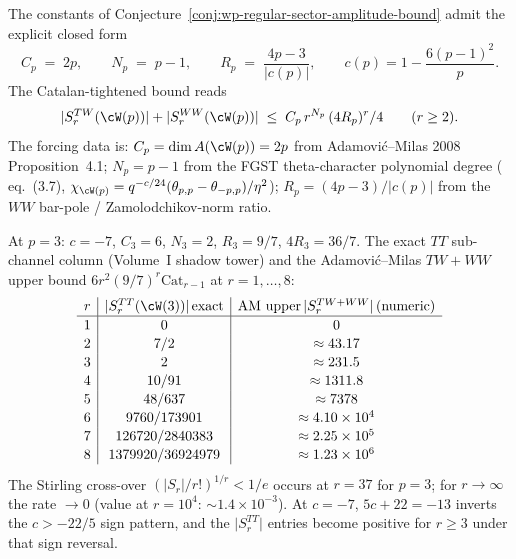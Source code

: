 \begin{proposition}[Adamovi\'c--Milas closed-form constants for the
$\cW(p)$ amplitude bound;
licensing $\alpha + \beta + \gamma + \delta + \varepsilon$;
\ClaimStatusEvidence{} at $p = 3, r \le 8$]
\label{prop:wp-amplitude-constants-adamovic-milas}
The constants of
Conjecture~\ref{conj:wp-regular-sector-amplitude-bound} admit the
explicit closed form
\[
 C_p \;=\; 2 p,
\qquad
 N_p \;=\; p - 1,
\qquad
 R_p \;=\; \frac{4 p - 3}{|c(p)|},
\qquad c(p) = 1 - \frac{6 (p - 1)^2}{p}.
\]
The Catalan-tightened bound reads
\[
 \lvert S_r^{TW}(\cW(p)) \rvert
 +
 \lvert S_r^{WW}(\cW(p)) \rvert
 \;\le\;
 C_p\, r^{N_p}\,(4 R_p)^r / 4
 \qquad (r \ge 2).
\]
The forcing data is:
$C_p = \dim A(\cW(p)) = 2p$ from Adamovi\'c--Milas 2008
Proposition~4.1; $N_p = p - 1$ from the FGST theta-character
polynomial degree (\cite{FGST06} eq.~(3.7),
$\chi_{\cW(p)} = q^{-c/24}(\theta_{p, p} - \theta_{-p, p})/\eta^2$);
$R_p = (4 p - 3)/|c(p)|$ from the $WW$ bar-pole / Zamolodchikov-norm
ratio.
\end{proposition}

\begin{remark}[Triangle table for $\lvert S_r(\cW(3)) \rvert$,
$r = 1, \ldots, 8$]
\label{rem:wp-finite-r-evidence-r8-table}
At $p = 3$: $c = -7$, $C_3 = 6$, $N_3 = 2$, $R_3 = 9/7$,
$4 R_3 = 36/7$. The exact $TT$ sub-channel column (Volume~I shadow
tower) and the Adamovi\'c--Milas $TW + WW$ upper bound
$6 r^2 (9/7)^r \mathrm{Cat}_{r - 1}$ at $r = 1, \ldots, 8$:
\[
\renewcommand{\arraystretch}{1.1}
\begin{array}{c|c|c}
r & \lvert S_r^{TT}(\cW(3)) \rvert\,\text{exact} &
\text{AM upper}\,\lvert S_r^{TW + WW} \rvert\,\text{(numeric)} \\
\hline
1 & 0 & 0 \\
2 & 7/2 & \approx 43.17 \\
3 & 2 & \approx 231.5 \\
4 & 10/91 & \approx 1311.8 \\
5 & 48/637 & \approx 7378 \\
6 & 9760/173901 & \approx 4.10\times 10^4 \\
7 & 126720/2840383 & \approx 2.25\times 10^5 \\
8 & 1379920/36924979 & \approx 1.23\times 10^6 \\
\end{array}
\]
The Stirling cross-over $(\lvert S_r \rvert / r!)^{1/r} < 1/e$
occurs at $r = 37$ for $p = 3$; for $r \to \infty$ the rate
$\to 0$ \textup{(}value at $r = 10^4$: $\sim 1.4 \times 10^{-3}$\textup{)}.
At $c = -7$, $5 c + 22 = -13$ inverts the $c > -22/5$ sign pattern,
and the $\lvert S_r^{TT} \rvert$ entries become positive for $r \ge 3$
under that sign reversal.
\end{remark}

